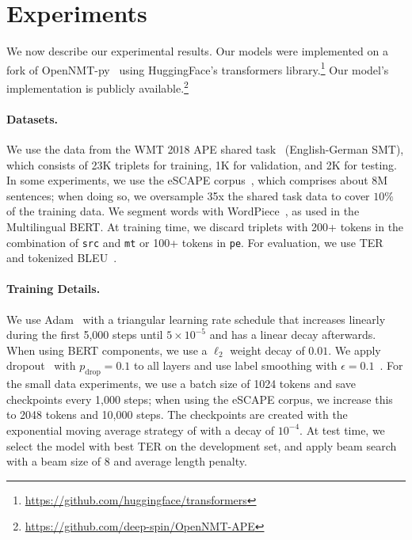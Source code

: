 \section{Experiments} \label{sec:experiments}

We now describe our experimental results. Our models were implemented
on a fork of OpenNMT-py~\citep{klein2017opennmt} using HuggingFace's
transformers
library.\footnote{\url{https://github.com/huggingface/transformers}}
Our model's implementation is publicly
available.\footnote{\url{https://github.com/deep-spin/OpenNMT-APE}}

\paragraph*{Datasets.}
We use the data from the WMT 2018 APE shared
task~\citep{Chatterjee2018} (English-German SMT), which consists of
23K triplets for training, 1K for validation, and 2K for
testing. In some experiments, we use the eSCAPE
corpus~\citep{negri2018escape}, which comprises about 8M sentences;
when doing so, we oversample 35x the shared task data to cover $10\%$
of the training data. We segment words with
WordPiece~\citep{wu2016google}, as used in the
Multilingual BERT. At training time, we discard triplets with 200+
tokens in the combination of {\tt src} and {\tt mt} or 100+ tokens in
    {\tt pe}. For evaluation, we use TER~\citep{snover2006study} and
tokenized BLEU~\citep{papineni2002bleu}.

\paragraph*{Training Details.}
We use Adam~\citep{kingma2014adam} with a triangular learning rate
schedule that increases linearly during the first 5,000 steps until
$5\times 10^{-5}$ and has a linear decay afterwards. When using BERT
components, we use a $\ell_2$ weight decay of $0.01$. We apply
dropout~\citep{srivastava2014dropout} with $p_{\text{drop}}\!=\!0.1$ to all
layers and use label smoothing with
$\epsilon\!=\!0.1$~\citep{pereyra2017regularizing}. For the small data
experiments, we use a batch size of 1024 tokens and save checkpoints
every 1,000 steps; when using the eSCAPE corpus, we increase this to
2048 tokens and 10,000 steps. The checkpoints are created with the
exponential moving average strategy of \citet{junczys2018marian}
with a decay of $10^{-4}$. At test time, we select the model with
best TER on the development set, and apply beam search with a beam
size of 8 and average length penalty.

